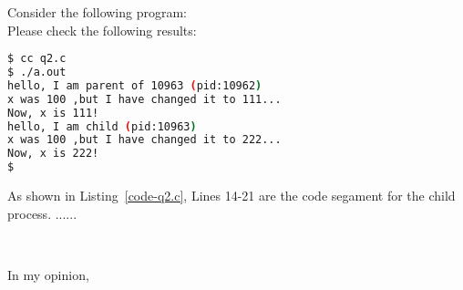 \documentclass[10pt, answers]{exam}
\begin{document}
\begin{questions}
\begin{solution}

Consider the following program:\\



Please check the following results:

\begin{lstlisting}[language=bash]
$ cc q2.c
$ ./a.out 
hello, I am parent of 10963 (pid:10962)
x was 100 ,but I have changed it to 111...
Now, x is 111!
hello, I am child (pid:10963)
x was 100 ,but I have changed it to 222...
Now, x is 222!
$
\end{lstlisting}

As shown in Listing~\ref{code-q2.c}, Lines 14-21 are the code segament for the child process. ......

\end{solution}





\\
\begin{answer}
	In my opinion, 
\end{answer}

\end{questions}
\end{document}
